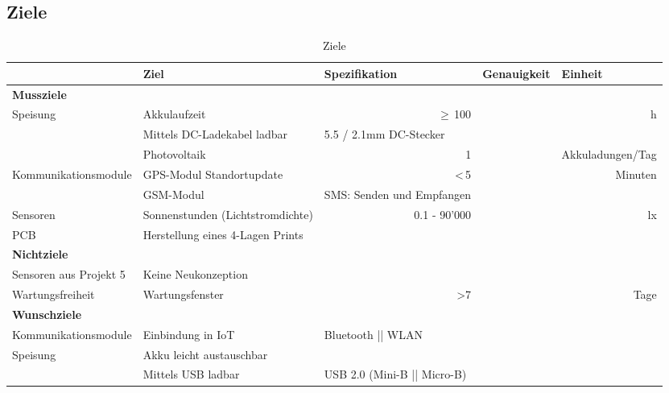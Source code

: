 \begin{landscape}
\subsection{Ziele}
\begin{table}[htbp]
  \centering
  \renewcommand{\arraystretch}{1.1} %
  \caption{Ziele}
    \begin{tabular}{l|l|l|r|r}
          & \textbf{Ziel} & \multicolumn{1}{l|}{\textbf{Spezifikation}} & \multicolumn{1}{l|}{\textbf{Genauigkeit}} & \multicolumn{1}{l}{\textbf{Einheit}} \\
    \toprule
    \multicolumn{1}{l}{\textbf{Mussziele}} & \multicolumn{4}{r}{} \\
    \toprule
  \multirow{3}{*}{Speisung} & Akkulaufzeit & \multicolumn{1}{r|}{$\geq$\,100} &   & h \\
    \cline{2-5}  & Mittels DC-Ladekabel ladbar &      5.5 / 2.1mm DC-Stecker &       &  \\
	\cline{2-5}           & Photovoltaik &    \multicolumn{1}{r|}{1}   &       & Akkuladungen/Tag \\
    \hline
  \multirow{2}{*}{Kommunikationsmodule} & GPS-Modul Standortupdate   &  \multicolumn{1}{r|}{<\,5}  &       & Minuten \\
	\cline{2-5}          & GSM-Modul  & SMS: Senden und Empfangen &       &  \\
\hline
Sensoren & Sonnenstunden (Lichtstromdichte) & \multicolumn{1}{r|}{0.1 - 90'000} & & lx \\
\hline
PCB & Herstellung eines 4-Lagen Prints & & & \\
    \bottomrule
    \multicolumn{1}{l}{\textbf{Nichtziele}} & \multicolumn{4}{r}{} \\
    \toprule
     Sensoren aus Projekt 5& Keine Neukonzeption &  &  &  \\
     \hline
     Wartungsfreiheit & Wartungsfenster & \multicolumn{1}{r|}{>7} &  & Tage \\
    \bottomrule
    \multicolumn{1}{l}{\textbf{Wunschziele}} & \multicolumn{4}{r}{} \\
    \toprule
    Kommunikationsmodule & Einbindung in IoT &       Bluetooth || WLAN &       &  \\
    \hline
    \multirow{2}{*}{Speisung} & Akku leicht austauschbar &       &       &  \\
\cline{2-5}  & Mittels USB ladbar & USB 2.0 (Mini-B || Micro-B) &       &  \\


\end{tabular}
\end{table}
\end{landscape}
